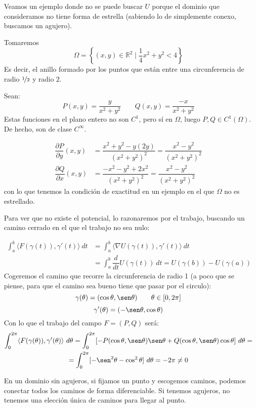 Veamos un ejemplo donde no se puede buscar $U$ porque el dominio que consideramos no tiene forma de estrella (sabiendo lo de simplemente conexo, buscamos un agujero).
\begin{ejemplo}
    Tomaremos 
    \begin{equation*}
        \Omega = \left\{(x,y)\in \mathbb{R}^2 \mid \dfrac{1}{4}x^2+y^2 < 4\right\}
    \end{equation*}
    Es decir, el anillo formado por los puntos que están entre una circunferencia de radio $\nicefrac{1}{2}$ y radio $2$. %

    Sean:
    \begin{equation*}
        P(x,y) = \dfrac{y}{x^2+y^2} \qquad Q(x,y) = \dfrac{-x}{x^2+y^2}
    \end{equation*}
    Estas funciones en el plano entero no son $C^1$, pero sí en $\Omega$, luego $P,Q\in C^1(\Omega)$. De hecho, son de clase $C^\infty$.

    \begin{align*}
        \dfrac{\partial P}{\partial y}(x,y) &= \dfrac{x^2+y^2 - y(2y)}{{(x^2+y^2)}^{2}} = \dfrac{x^2-y^2}{{(x^2+y^2)}^{2}} \\
        \dfrac{\partial Q}{\partial x}(x,y) &= \dfrac{-x^2-y^2+2x^2}{{(x^2+y^2)}^{2}} = \dfrac{x^2-y^2}{{(x^2+y^2)}^{2}}
    \end{align*}
    con lo que tenemos la condición de exactitud en un ejemplo en el que $\Omega$ no es estrellado.

    Para ver que no existe el potencial, lo razonaremos por el trabajo, buscando un camino cerrado en el que el trabajo no sea nulo:

    \begin{align*}
        \int_{a}^{b} \langle F(\gamma(t)),\gamma'(t) \rangle~dt  &= \int_{a}^{b} \langle \nabla U(\gamma(t)), \gamma'(t) \rangle~dt   \\
                                                                 &= \int_{a}^{b} \dfrac{d}{dt}U(\gamma(t))~dt  = U(\gamma(b)) - U(\gamma(a))
    \end{align*}
    Cogeremos el camino que recorre la circunferencia de radio 1 (a poco que se piense, para que el camino sea bueno tiene que pasar por el circulo):
    \begin{equation*}
        \gamma(\theta) = (\cos\theta, \sen\theta) \qquad \theta \in [0,2\pi]
    \end{equation*}
    \begin{equation*}
        \gamma'(\theta) = (-\sen\theta,\cos\theta)
    \end{equation*}
    Con lo que el trabajo del campo $F=(P,Q)$ será:
    \begin{multline*}
        \int_{0}^{2\pi } \langle F(\gamma(\theta)),\gamma'(\theta) \rangle~d\theta = \int_{0}^{2\pi} [-P(\cos\theta,\sen\theta)\sen\theta + Q(\cos\theta,\sen\theta)\cos\theta]~d\theta  = \\
        = \int_{0}^{2\pi } [-\sen^2\theta-\cos^2\theta]~d\theta  = -2\pi \neq 0
    \end{multline*}
\end{ejemplo}

En un dominio sin agujeros, si fijamos un punto y escogemos caminos, podemos conectar todos los caminos de forma diferenciable.
Si tenemos agujeros, no tenemos una elección única de caminos para llegar al punto.
